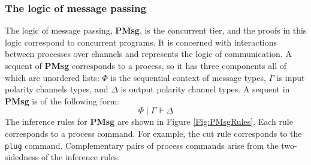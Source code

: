 \documentclass[acmsmall]{acmart}
\begin{document}
\subsubsection{The logic of message passing}
	
The logic of message passing, {\bf PMsg}, is the concurrent tier, and the proofs in this logic correspond to concurrent programs. 
It is concerned with interactions between processes over channels and represents the logic of communication. 
A sequent of {\bf PMsg} corresponds to a process, so it has three components all of which are unordered lists: $\Phi$ is the sequential context of message types, $\Gamma$ is input polarity channels types, and $\Delta$ is output polarity channel types. A sequent in {\bf PMsg} is of the following form:
\[ \Phi \mid \Gamma \Vdash \Delta \]	
The inference rules for {\bf PMsg} are shown in Figure \ref{Fig:PMsgRules}. 
Each rule corresponds to a process command.
For example, the cut rule corresponds to the \lstinline{plug} command.
Complementary pairs of process commands arise from the two-sidedness of the inference rules.
\end{document}
